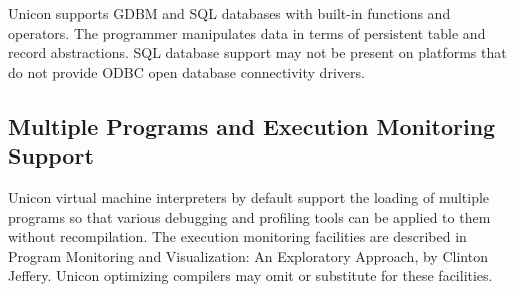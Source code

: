 Unicon supports GDBM and SQL databases with
built-in functions and operators. The programmer manipulates data in
terms of persistent table and record abstractions. SQL database support
may not be present on platforms that do not provide ODBC
open database connectivity drivers.

\subsection{Multiple Programs and Execution Monitoring Support}

Unicon virtual machine interpreters by default support the loading of
multiple programs so that various debugging and profiling tools can be
applied to them without recompilation. The execution monitoring
facilities are described in {\textquotedbl}Program Monitoring and
Visualization: An Exploratory Approach{\textquotedbl}, by Clinton
Jeffery. Unicon optimizing compilers may omit or substitute for these
facilities.

\clearpage
\bigskip

